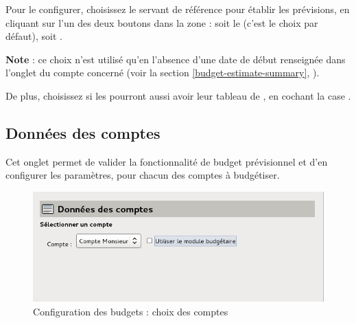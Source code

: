 Pour le configurer, choisissez le  servant de référence pour établir les prévisions, en cliquant sur l'un des deux boutons dans la zone  : soit le  (c'est le choix par défaut), soit . 


\textbf{Note} : ce choix n'est utilisé qu'en l'absence d'une date de début renseignée dans l'onglet  du compte concerné (voir la section \vref{budget-estimate-summary}, ).

De plus, choisissez si les  pourront aussi avoir leur tableau de , en cochant la case .


\subsection{Données des comptes\label{setup-budget-data}}

Cet onglet permet de valider la fonctionnalité de budget prévisionnel et d'en configurer les paramètres, pour chacun des comptes à budgétiser.

\ifIllustration
\begin{figure}[htbp]
\begin{center}
\includegraphics[scale=0.5]{image/screenshot/setup_budget_data1}
\end{center}
\caption{Configuration des budgets : choix des comptes}
\label{setup-budgetData1-img}
\end{figure}
\fi

